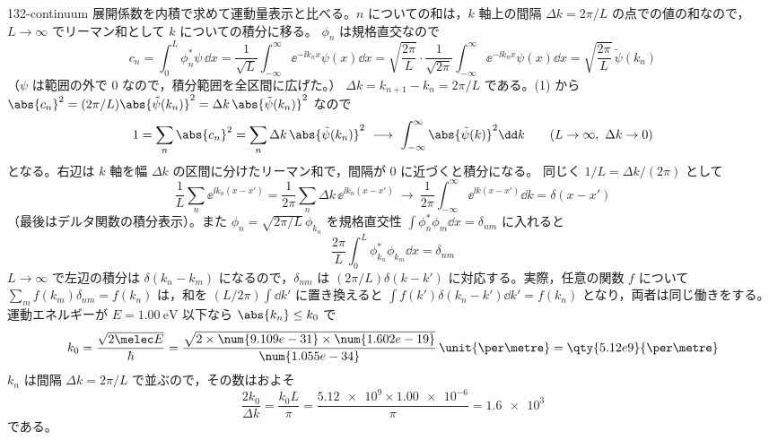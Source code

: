 \documentclass[uplatex,dvipdfmx,a4paper,11pt]{jsarticle}
\begin{document}
\begin{kaisetsu}{132-continuum}
\houshin 展開係数を内積で求めて運動量表示と比べる。$n$ についての和は，$k$ 軸上の間隔 $\Delta k=2\pi/L$ の点での値の和なので，$L\to\infty$ でリーマン和として $k$ についての積分に移る。
\keisan
{} $\phi_{n}$ は規格直交なので
\[ c_{n}=\int_{0}^{L}\phi_{n}^{*}\psi\,\dd x=\frac{1}{\sqrt{L}}\int_{-\infty}^{\infty}\ee^{-\ii k_{n}x}\psi(x)\dd x=\sqrt{\frac{2\pi}{L}}\cdot\frac{1}{\sqrt{2\pi}}\int_{-\infty}^{\infty}\ee^{-\ii k_{n}x}\psi(x)\dd x=\sqrt{\frac{2\pi}{L}}\,\tilde{\psi}(k_{n}) \]
（$\psi$ は範囲の外で $0$ なので，積分範囲を全区間に広げた。）
 $\Delta k=k_{n+1}-k_{n}=2\pi/L$ である。(1) から $\abs{c_{n}}^{2}=(2\pi/L)\abs{\tilde{\psi}(k_{n})}^{2}=\Delta k\,\abs{\tilde{\psi}(k_{n})}^{2}$ なので
\[ 1=\sum_{n}\abs{c_{n}}^{2}=\sum_{n}\Delta k\,\abs{\tilde{\psi}(k_{n})}^{2}\ \longrightarrow\ \int_{-\infty}^{\infty}\abs{\tilde{\psi}(k)}^{2}\dd k\qquad(L\to\infty,\ \Delta k\to0) \]
となる。右辺は $k$ 軸を幅 $\Delta k$ の区間に分けたリーマン和で，間隔が $0$ に近づくと積分になる。
 同じく $1/L=\Delta k/(2\pi)$ として
\[ \frac{1}{L}\sum_{n}\ee^{\ii k_{n}(x-x')}=\frac{1}{2\pi}\sum_{n}\Delta k\,\ee^{\ii k_{n}(x-x')}\ \longrightarrow\ \frac{1}{2\pi}\int_{-\infty}^{\infty}\ee^{\ii k(x-x')}\dd k=\delta(x-x') \]
（最後はデルタ関数の積分表示）。また $\phi_{n}=\sqrt{2\pi/L}\,\phi_{k_{n}}$ を規格直交性 $\int\phi_{n}^{*}\phi_{m}\dd x=\delta_{nm}$ に入れると
\[ \frac{2\pi}{L}\int_{0}^{L}\phi_{k_{n}}^{*}\phi_{k_{m}}\dd x=\delta_{nm} \]
$L\to\infty$ で左辺の積分は $\delta(k_{n}-k_{m})$ になるので，$\delta_{nm}$ は $(2\pi/L)\delta(k-k')$ に対応する。実際，任意の関数 $f$ について $\sum_{m}f(k_{m})\delta_{nm}=f(k_{n})$ は，和を $(L/2\pi)\int\dd k'$ に置き換えると $\int f(k')\delta(k_{n}-k')\dd k'=f(k_{n})$ となり，両者は同じ働きをする。
 運動エネルギーが $E=\qty{1.00}{\electronvolt}$ 以下なら $\abs{k_{n}}\le k_{0}$ で
\[ k_{0}=\frac{\sqrt{2\melec E}}{\hbar}=\frac{\sqrt{2\times\num{9.109e-31}\times\num{1.602e-19}}}{\num{1.055e-34}}\,\unit{\per\metre}=\qty{5.12e9}{\per\metre} \]
$k_{n}$ は間隔 $\Delta k=2\pi/L$ で並ぶので，その数はおよそ
\[ \frac{2k_{0}}{\Delta k}=\frac{k_{0}L}{\pi}=\frac{\num{5.12e9}\times\num{1.00e-6}}{\pi}=\num{1.6e3} \]
である。
\end{kaisetsu}
\end{document}
